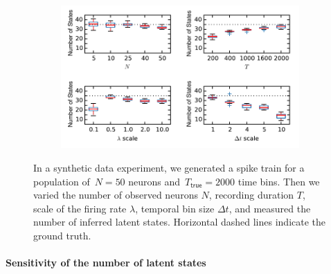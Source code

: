 \begin{figure}  
  \centering
  \begin{subfigure}[t]{5in}
    \includegraphics[width=\textwidth]{figures/ch7/Fig3_old.pdf}
  \end{subfigure}
  \caption[Inferred parameters of the HDP-HMM for synthetic data]{In a
    synthetic data experiment, we generated a spike train for a
    population of~$N=50$ neurons
    and~$T_{\textsf{true}}=2000$ time bins. Then we varied the number
    of observed neurons $N$, recording duration $T$, scale of the firing
    rate $\lambda$, temporal bin size $\Delta t$, and measured the
    number of inferred latent states. Horizontal dashed lines indicate
    the ground truth.}
  \label{fig3}
\end{figure}


\paragraph{Sensitivity of the number of latent states} 


